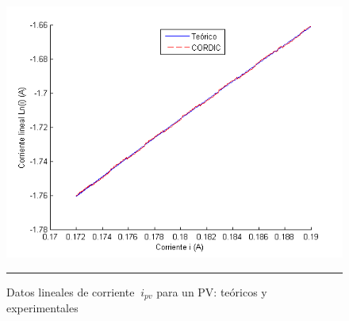 \begin{figure}[H]
  \centering
    \includegraphics[scale=0.7]{./grafico1.png}
    \rule{35em}{0.5pt}
  \caption[Datos lineales de corriente ipv]{Datos lineales de corriente $\ i_{pv}$ para un PV: teóricos y experimentales   }
  \label{fig:lineal}
\end{figure}









    